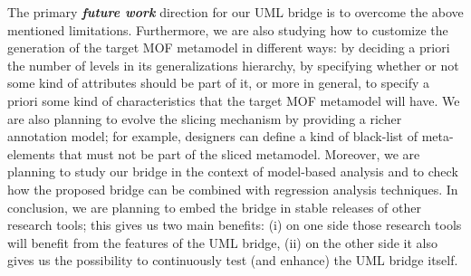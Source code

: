 The primary \textbf{\textit{future work}} direction for our UML bridge is to overcome the above mentioned limitations.
Furthermore, we are also studying how to customize the generation of the target MOF metamodel in different ways: by deciding a priori the number of levels in its generalizations hierarchy, by specifying whether or not some kind of attributes should be part of it, or more in general, to specify a priori some kind of characteristics that the target MOF metamodel will have. 
We are also planning to evolve the slicing mechanism by providing a richer annotation model; for example,
designers can define a kind of black-list of meta-elements that must not be part of the sliced metamodel. 
Moreover, we are planning to study our bridge in the context of model-based analysis and to check
how the proposed bridge can be combined with regression analysis techniques.
In conclusion, we are planning to embed the bridge in stable releases of other research tools; this gives us two main benefits:
(i) on one side those research tools will benefit from the features of the UML bridge, 
(ii) on the other side it also gives us the possibility to continuously test (and enhance) the UML bridge itself.


